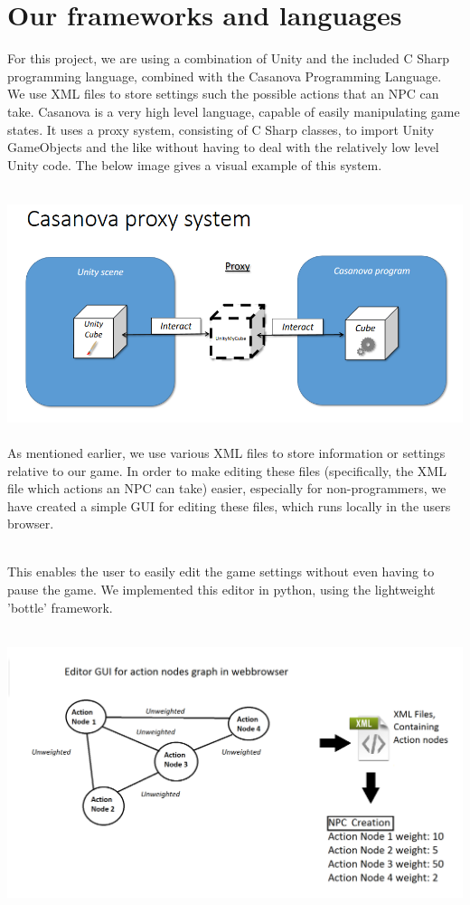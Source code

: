\documentclass[11pt]{article} %
\begin{document}
\newpage
\section{Our frameworks and languages}
For this project, we are using a combination of Unity and the included C Sharp programming language, combined with the Casanova Programming Language. We use XML files to store settings such the possible actions that an NPC can take.
Casanova is a very high level language, capable of easily manipulating game states. It uses a proxy system, consisting of C Sharp classes, to import Unity GameObjects and the like without having to deal with the relatively low level Unity code. The below image gives a visual example of this system.


~\\
\includegraphics[scale=0.5]{proxySystem}
~\\

\newpage
As mentioned earlier, we use various XML files to store information or settings relative to our game. In order to make editing these files (specifically, the XML file which actions an NPC can take) easier, especially for non-programmers, we have created a simple GUI for editing these files, which runs locally in the users browser. 

~\\
This enables the user to easily edit the game settings without even having to pause the game. We implemented this editor in python, using the lightweight 'bottle' framework.

~\\
\includegraphics[scale=0.35]{XmlSystem}
\end{document}
